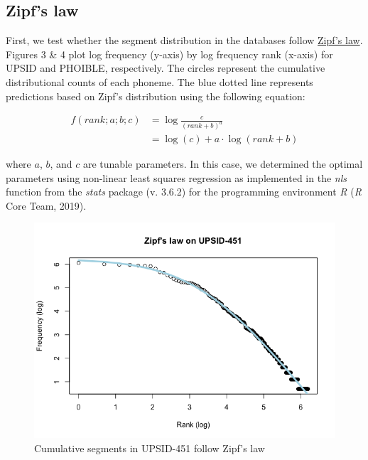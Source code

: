 \documentclass[
]{article}
\begin{document}
\hypertarget{zipfs-law}{%
\subsection{Zipf's law}\label{zipfs-law}}

First, we test whether the segment distribution in the databases follow
\href{https://en.wikipedia.org/wiki/Zipf\%27s_law}{Zipf's law}. Figures
3 \& 4 plot log frequency (y-axis) by log frequency rank (x-axis) for
UPSID and PHOIBLE, respectively. The circles represent the cumulative
distributional counts of each phoneme. The blue dotted line represents
predictions based on Zipf's distribution using the following equation:

\[
\begin{aligned}
  f(rank;a;b;c) & = \log{\frac{c}{(rank+b)^a}} \\ 
  &= \log{(c) + a \cdot\log{(rank + b)}}
\end{aligned}
\]

where \(a\), \(b\), and \(c\) are tunable parameters. In this case, we
determined the optimal parameters using non-linear least squares
regression as implemented in the \emph{nls} function from the
\emph{stats} package (v. 3.6.2) for the programming environment \emph{R}
(\emph{R} Core Team, 2019).

\begin{figure}

{\centering \includegraphics[width=0.8\linewidth]{README_files/figure-gfm/zipf_distribution_upsid-1} 

}

\caption{\label{fig:upsid}Cumulative segments in UPSID-451 follow Zipf's law}\label{fig:upsid_zipf}
\end{figure}
\end{document}

